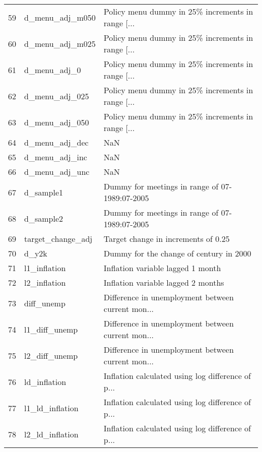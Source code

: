 \begin{tabular}{lll}
59  &            d\_menu\_adj\_m050 &  Policy menu dummy in 25\% increments in range [... \\
60  &            d\_menu\_adj\_m025 &  Policy menu dummy in 25\% increments in range [... \\
61  &               d\_menu\_adj\_0 &  Policy menu dummy in 25\% increments in range [... \\
62  &             d\_menu\_adj\_025 &  Policy menu dummy in 25\% increments in range [... \\
63  &             d\_menu\_adj\_050 &  Policy menu dummy in 25\% increments in range [... \\
64  &             d\_menu\_adj\_dec &                                                NaN \\
65  &             d\_menu\_adj\_inc &                                                NaN \\
66  &             d\_menu\_adj\_unc &                                                NaN \\
67  &                  d\_sample1 &     Dummy for meetings in range of 07-1989:07-2005 \\
68  &                  d\_sample2 &     Dummy for meetings in range of 07-1989:07-2005 \\
69  &          target\_change\_adj &                Target change in increments of 0.25 \\
70  &                      d\_y2k &            Dummy for the change of century in 2000 \\
71  &               l1\_inflation &                  Inflation variable lagged 1 month \\
72  &               l2\_inflation &                 Inflation variable lagged 2 months \\
73  &                 diff\_unemp &  Difference in unemployment between current mon... \\
74  &              l1\_diff\_unemp &  Difference in unemployment between current mon... \\
75  &              l2\_diff\_unemp &  Difference in unemployment between current mon... \\
76  &               ld\_inflation &  Inflation calculated using log difference of p... \\
77  &            l1\_ld\_inflation &  Inflation calculated using log difference of p... \\
78  &            l2\_ld\_inflation &  Inflation calculated using log difference of p... \\

\end{tabular}

